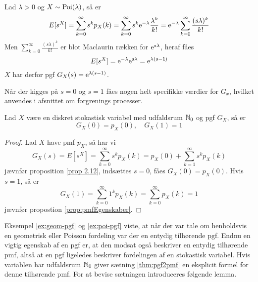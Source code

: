 \begin{exmp}\label{ex:poi-pgf}
Lad $\lambda > 0$ og $X \sim \textnormal{Poi}(\lambda)$, så er 
\begin{equation*}
    E[s^X] = \sum_{k = 0}^\infty s^k p_X(k) = \sum^\infty_{k = 0} s^k\mathrm{e}^{-\lambda}\frac{\lambda^k}{k!} = \mathrm{e}^{-\lambda} \sum^\infty_{k = 0} \frac{(s\lambda)^k}{k!}  
\end{equation*}
Men $\displaystyle \sum^\infty_{k = 0} \frac{(s\lambda)^k}{k!}$ er blot Maclaurin rækken for $\mathrm{e}^{s\lambda}$, heraf fåes
\begin{equation*}
    E[s^X] = \mathrm{e}^{-\lambda} \mathrm{e}^{s\lambda} = \mathrm{e}^{\lambda(s - 1)}
\end{equation*}
$X$ har derfor pgf $G_X(s) = \mathrm{e}^{\lambda(s - 1)}$. 
\end{exmp}

Når der kigges på $s=0$ og $s=1$ fåes nogen helt specifikke værdier for $G_x$, hvilket anvendes i afsnittet om forgrenings processer.  
 
\begin{prop}\label{prop:pgfI0Og1} %
    Lad $X$ være en diskret stokastisk variabel med udfaldsrum $\mathbb{N}_0$ og pgf $G_X$, så er 
    \begin{equation*}
        G_X (0) = p_X(0), \quad G_X(1) = 1
    \end{equation*}
\end{prop}

\begin{proof}
Lad $X$ have pmf $p_X$, så har vi
\begin{equation*}
    G_X(s) = E[s^X] = \sum_{k = 0}^\infty s^k p_X(k) = p_X(0) + \sum_{k = 1}^\infty s^k p_X(k)
\end{equation*}
jævnfør proposition \ref{prop 2.12}, indsættes $s = 0$, fåes $G_X(0) = p_X(0)$. Hvis $s = 1$, så er 
\begin{equation*}
    G_X(1) = \sum^\infty_{k = 0} 1^k p_X(k) = \sum^\infty_{k = 0} p_X(k) = 1
\end{equation*}
jævnfør propostion \ref{prop:pmfEgenskaber}.
\end{proof}

Eksempel \ref{ex:geom-pgf} og \ref{ex:poi-pgf} viste, at når der var tale om henholdsvis en geometrisk eller Poisson fordeling var der en entydig tilhørende pgf. Endnu en vigtig egenskab af en pgf er, at den modsat også beskriver en entydig tilhørende pmf, altså at en pgf ligeledes beskriver fordelingen af en stokastisk variabel. Hvis variablen har udfaldsrum $\mathbb{N}_0$ giver sætning \ref{thm:pgf2pmf} en eksplicit formel for denne tilhørende pmf. For at bevise sætningen introduceres følgende lemma. 

